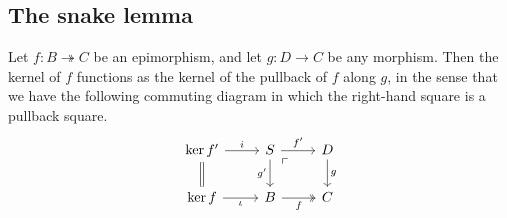 \documentclass[main.tex]{subfiles}
\begin{document}
\subsection{The snake lemma}
\label{ssc:the_snake_lemma}

\begin{lemma}
  \label{lemma:pullback_preserves_kernel}
  Let $f\colon B \twoheadrightarrow C$ be an epimorphism, and let $g\colon D \to C$ be any morphism. Then the kernel of $f$ functions as the kernel of the pullback of $f$ along $g$, in the sense that we have the following commuting diagram in which the right-hand square is a pullback square.
  \begin{equation*}
    \begin{tikzcd}
      \ker f'
      \arrow[d, equals]
      \arrow[r, "i"]
      & S
      \arrow[dr, phantom, "\ulcorner", very near start]
      \arrow[r, "f'"]
      \arrow[d, swap, "g'"]
      & D
      \arrow[d, "g"]
      \\
      \ker f
      \arrow[r, swap, "\iota"]
      & B
      \arrow[r, twoheadrightarrow, swap, "f"]
      & C
    \end{tikzcd}
  \end{equation*}
\end{lemma}
\end{document}
